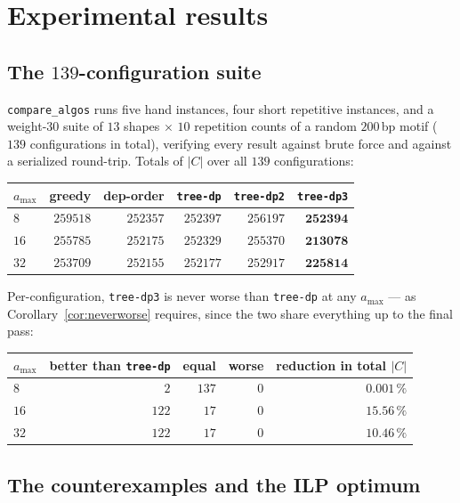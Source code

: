 \documentclass[11pt,a4paper]{article}
\theoremstyle{definition}
\theoremstyle{plain}
\theoremstyle{remark}
\begin{document}
\section{Experimental results}
\label{sec:experiments}

\subsection{The $139$-configuration suite}

\texttt{compare\_algos} runs five hand instances, four short repetitive
instances, and a weight-$30$ suite of $13$ shapes $\times$ $10$
repetition counts of a random $200$\,bp motif ($139$ configurations in
total), verifying every result against brute force and against a
serialized round-trip. Totals of $|C|$ over all $139$ configurations:

\begin{center}
\begin{tabular}{@{}lrrrrr@{}}
\toprule
$a_{\max}$ & greedy & dep-order & \texttt{tree-dp} & \texttt{tree-dp2} & \texttt{tree-dp3} \\
\midrule
$8$  & $259518$ & $252357$ & $252397$ & $256197$ & $\mathbf{252394}$ \\
$16$ & $255785$ & $252175$ & $252329$ & $255370$ & $\mathbf{213078}$ \\
$32$ & $253709$ & $252155$ & $252177$ & $252917$ & $\mathbf{225814}$ \\
\bottomrule
\end{tabular}
\end{center}

Per-configuration, \texttt{tree-dp3} is never worse than \texttt{tree-dp}
at any $a_{\max}$ --- as Corollary~\ref{cor:neverworse} requires, since
the two share everything up to the final pass:

\begin{center}
\begin{tabular}{@{}lrrrr@{}}
\toprule
$a_{\max}$ & better than \texttt{tree-dp} & equal & worse & reduction in total $|C|$ \\
\midrule
$8$  & $2$   & $137$ & $0$ & $0.001\,\%$ \\
$16$ & $122$ & $17$  & $0$ & $15.56\,\%$ \\
$32$ & $122$ & $17$  & $0$ & $10.46\,\%$ \\
\bottomrule
\end{tabular}
\end{center}

\subsection{The counterexamples and the ILP optimum}
\end{document}
